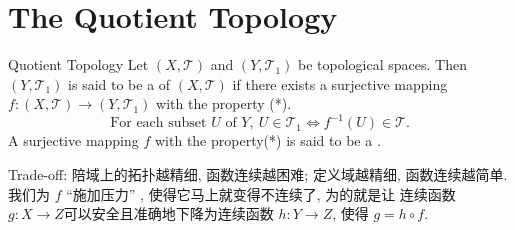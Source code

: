 \documentclass[../main.tex]{subfiles}
\begin{document}
\ifSubfilesClassLoaded{

    
}{}

\chapter{ The Quotient Topology }
\begin{definition}{Quotient Topology}{}
Let $(X, \mathcal{T})$ and $(Y, \mathcal{T}_1)$ be topological spaces. Then $(Y, \mathcal{T}_1)$ is said to be a  of $(X, \mathcal{T})$ if there exists a surjective mapping $f:(X, \mathcal{T}) \to (Y, \mathcal{T}_1)$ with the property (*).
\begin{equation}
\text{For each subset } U \text{ of } Y, \ U \in \mathcal{T}_1 \iff f^{-1}(U) \in \mathcal{T}. \tag{*}
\end{equation}
A surjective mapping $f$ with the property(*) is said to be a .
\end{definition}

\begin{note}
   Trade-off:  陪域上的拓扑越精细, 函数连续越困难; 定义域越精细, 函数连续越简单. 我们为 \(  f  \) ``施加压力'' , 使得它马上就变得不连续了, 为的就是让 连续函数 \( g :X\to Z\)可以安全且准确地下降为连续函数 \( h :Y\to Z\), 使得 \(  g = h\circ f  \). 

\end{note}
\end{document}
